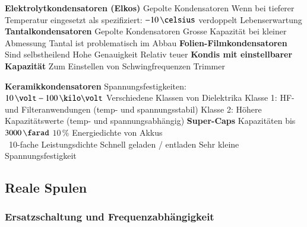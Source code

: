\begin{minipage}[t]{0.48\columnwidth}
    \begin{outline}
        \1 \textbf{Elektrolytkondensatoren (Elkos)}
            \2 Gepolte Kondensatoren
            \2 Wenn bei tieferer Temperatur eingesetzt als spezifiziert: 
                $-10 \, \celsius$ verdoppelt Lebenserwartung
        \1 \textbf{Tantalkondensatoren}
            \2 Gepolte Kondensatoren
            \2 Grosse Kapazität bei kleiner Abmessung
            \2 Tantal ist problematisch im Abbau
        \1 \textbf{Folien-Filmkondensatoren}
            \2 Sind selbstheilend 
            \2 Hohe Genauigkeit
            \2 Relativ teuer
        \1 \textbf{Kondis mit einstellbarer Kapazität}
            \2 Zum Einstellen von Schwingfrequenzen
            \2 Trimmer
    \end{outline}
\end{minipage}
\hfill
\begin{minipage}[t]{0.48\columnwidth}
    \begin{outline}
        \1 \textbf{Keramikkondensatoren}
            \2 Spannungsfestigkeiten:\\ 
                $10 \, \volt - 100 \, \kilo \volt$
            \2 Verschiedene Klassen von Dielektrika
                \3 Klasse 1: HF- und Filteranwendungen (temp- und spannungsstabil)
                \3 Klasse 2: Höhere Kapazitätswerte (temp- und spannungsabhängig)
        \1 \textbf{Super-Caps}
            \2 Kapazitäten bis $3000 \, \farad$
            \2 $10 \, \%$ Energiedichte von Akkus \\
                \textrightarrow\ 10-fache Leistungsdichte 
            \2 Schnell geladen / entladen
            \2 Sehr kleine Spannungsfestigkeit
    \end{outline}
\end{minipage}


\subsection{Reale Spulen}


\subsubsection{Ersatzschaltung und Frequenzabhängigkeit}

